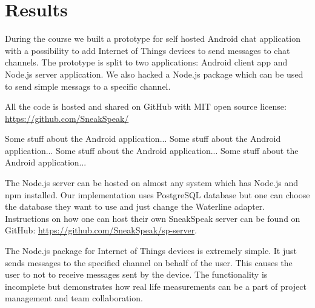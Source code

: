 \section{Results}
During the course we built a prototype for self hosted Android chat application with a possibility to add Internet of Things devices to send messages to chat channels. The prototype is split to two applications: Android client app and Node.js server application. We also hacked a Node.js package which can be used to send simple messags to a specific channel.

All the code is hosted and shared on GitHub with MIT open source license: \url{https://github.com/SneakSpeak/}



Some stuff about the Android application... Some stuff about the Android application... Some stuff about the Android application... Some stuff about the Android application...

The Node.js server can be hosted on almost any system which has Node.js and npm installed. Our implementation uses PostgreSQL database but one can choose the database they want to use and just change the Waterline adapter. Instructions on how one can host their own SneakSpeak server can be found on GitHub: \url{https://github.com/SneakSpeak/sp-server}.

The Node.js package for Internet of Things devices is extremely simple. It just sends messages to the specified channel on behalf of the user. This causes the user to not to receive messages sent by the device. The functionality is incomplete but demonstrates how real life measurements can be a part of project management and team collaboration. 
